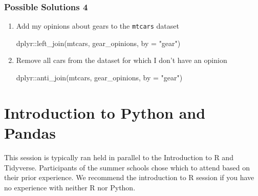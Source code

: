 \documentclass[
  letterpaper,
]{book}
\newenvironment{Shaded}{}{}
\newcommand{\AttributeTok}[1]{\textcolor[rgb]{0.84,0.23,0.29}{#1}}
\newcommand{\FunctionTok}[1]{\textcolor[rgb]{0.44,0.26,0.76}{#1}}
\newcommand{\NormalTok}[1]{\textcolor[rgb]{0.14,0.16,0.18}{#1}}
\newcommand{\SpecialCharTok}[1]{\textcolor[rgb]{0.00,0.36,0.77}{#1}}
\newcommand{\StringTok}[1]{\textcolor[rgb]{0.01,0.18,0.38}{#1}}
\begin{document}
\hypertarget{possible-solutions-4}{%
\subsection{Possible Solutions 4}\label{possible-solutions-4}}

\begin{enumerate}
\def\labelenumi{\arabic{enumi}.}
\item
  Add my opinions about gears to the \texttt{mtcars} dataset

\begin{Shaded}
\begin{Highlighting}[]
\NormalTok{dplyr}\SpecialCharTok{::}\FunctionTok{left\_join}\NormalTok{(mtcars, gear\_opinions, }\AttributeTok{by =} \StringTok{"gear"}\NormalTok{)}
\end{Highlighting}
\end{Shaded}
\item
  Remove all cars from the dataset for which I don't have an opinion

\begin{Shaded}
\begin{Highlighting}[]
\NormalTok{dplyr}\SpecialCharTok{::}\FunctionTok{anti\_join}\NormalTok{(mtcars, gear\_opinions, }\AttributeTok{by =} \StringTok{"gear"}\NormalTok{)}
\end{Highlighting}
\end{Shaded}
\end{enumerate}

\hypertarget{introduction-to-python-and-pandas}{%
\chapter{Introduction to Python and
Pandas}\label{introduction-to-python-and-pandas}}

\begin{tcolorbox}[enhanced jigsaw, opacitybacktitle=0.6, bottomtitle=1mm, opacityback=0, colback=white, coltitle=black, leftrule=.75mm, toprule=.15mm, title=\textcolor{quarto-callout-note-color}{\faInfo}\hspace{0.5em}{Note}, colframe=quarto-callout-note-color-frame, toptitle=1mm, arc=.35mm, left=2mm, titlerule=0mm, breakable, rightrule=.15mm, bottomrule=.15mm, colbacktitle=quarto-callout-note-color!10!white]

This session is typically ran held in parallel to the Introduction to R
and Tidyverse. Participants of the summer schools chose which to attend
based on their prior experience. We recommend the introduction to R
session if you have no experience with neither R nor Python.

\end{tcolorbox}
\end{document}
